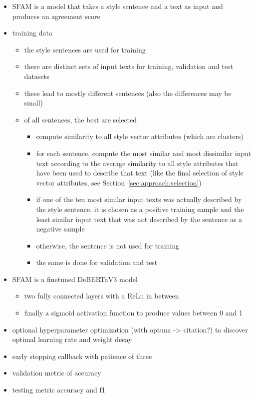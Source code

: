 \begin{itemize}
  \item SFAM is a model that takes a style sentence and a text as input and produces an agreement score
  \item training data
        \begin{itemize}
          \item the \numStyleSentences{} style sentences are used for training
          \item there are distinct sets of input texts for training, validation and test datasets
          \item these lead to mostly different sentences (also the differences may be small)
          \item of all sentences, the best are selected
                \begin{itemize}
                  \item compute similarity to all style vector attributes (which are clusters)
                  \item for each sentence, compute the most similar and most dissimilar input text according to the average similarity to all style attributes that have been used to describe that text (like the final selection of style vector attributes, see Section~\ref{sec:approach:selection}) %
                  \item if one of the ten most similar input texts was actually described by the style sentence, it is chosen as a positive training sample and the least similar input text that was not described by the sentence as a negative sample
                  \item otherwise, the sentence is not used for training
                  \item the same is done for validation and test
                \end{itemize}
        \end{itemize}
  \item SFAM is a finetuned DeBERTaV3 model
        \begin{itemize}
          \item two fully connected layers with a ReLu in between %
          \item finally a sigmoid activation function to produce values between 0 and 1
        \end{itemize}
  \item optional hyperparameter optimization (with optuna -> citation?) to discover optimal learning rate and weight decay
  \item early stopping callback with patience of three
  \item validation metric of accuracy
  \item testing metric accuracy and f1
\end{itemize}



